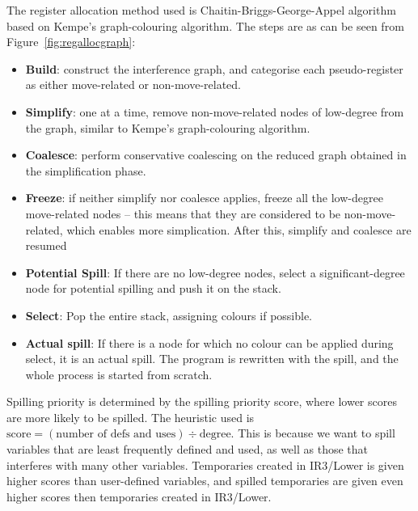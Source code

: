 \documentclass[nonacm, acmsmall, screen, 10pt]{acmart}
\begin{document}
The register allocation method used is Chaitin-Briggs-George-Appel algorithm based on Kempe's graph-colouring algorithm.
The steps are as can be seen from Figure~\ref{fig:regallocgraph}:
\begin{itemize}
  \item \textbf{Build}: construct the interference graph, and categorise each pseudo-register as either move-related or non-move-related.
  \item \textbf{Simplify}: one at a time, remove non-move-related nodes of low-degree from the graph, similar to Kempe's graph-colouring algorithm.
  \item \textbf{Coalesce}: perform conservative coalescing on the reduced graph obtained in the simplification phase.
  \item \textbf{Freeze}: if neither simplify nor coalesce applies, freeze all the low-degree move-related nodes -- this means that they are considered to be non-move-related, which enables more simplication.
        After this, simplify and coalesce are resumed
  \item \textbf{Potential Spill}: If there are no low-degree nodes, select a significant-degree node for potential spilling and push it on the stack.
  \item \textbf{Select}: Pop the entire stack, assigning colours if possible.
  \item \textbf{Actual spill}: If there is a node for which no colour can be applied during select, it is an actual spill.
        The program is rewritten with the spill, and the whole process is started from scratch.
\end{itemize}

Spilling priority is determined by the spilling priority score, where lower scores are more likely to be spilled.
The heuristic used is $\text{score} = (\text{number of defs and uses}) \div \text{degree}$.
This is because we want to spill variables that are least frequently defined and used, as well as those that interferes with many other variables.
Temporaries created in IR3/Lower is given higher scores than user-defined variables, and spilled temporaries are given even higher scores then temporaries created in IR3/Lower.
\end{document}
